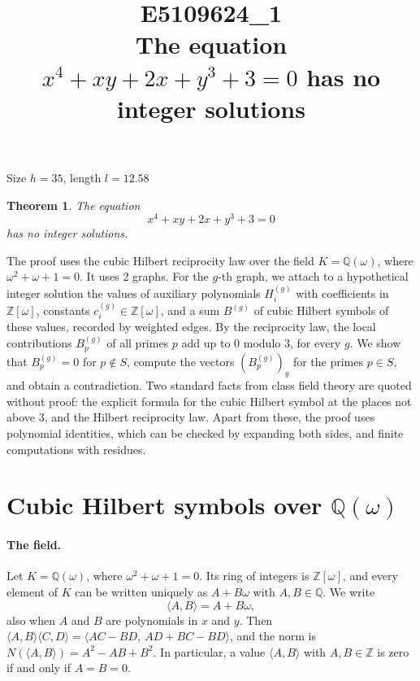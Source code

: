 \documentclass[11pt]{article}
\title{\textbf{E5109624\_1}\\[4pt] {\Large The equation $x^{4}+xy+2x+y^{3}+3=0$ has no integer solutions}}
\author{}
\date{}
\newtheorem{theorem}{Theorem}
\newcommand{\Z}{\mathbb{Z}}
\newcommand{\Q}{\mathbb{Q}}
\begin{document}
\maketitle
\vspace{-8ex}
\begin{center}
Size $h=35$, length $l=12.58$
\end{center}

\begin{theorem}\label{thm:main}
The equation
\begin{equation}\label{eq:main}
x^{4}+xy+2x+y^{3}+3=0
\end{equation}
has no integer solutions.
\end{theorem}

The proof uses the cubic Hilbert reciprocity law over the field $K=\Q(\omega)$, where $\omega^2+\omega+1=0$. It uses 2 graphs. For the $g$-th graph, we attach to a hypothetical integer solution the values of auxiliary polynomials $H^{(g)}_i$ with coefficients in $\Z[\omega]$, constants $c^{(g)}_i\in\Z[\omega]$, and a sum $B^{(g)}$ of cubic Hilbert symbols of these values, recorded by weighted edges. By the reciprocity law, the local contributions $B^{(g)}_p$ of all primes $p$ add up to $0$ modulo $3$, for every $g$. We show that $B^{(g)}_p=0$ for $p\notin S$, compute the vectors $(B^{(g)}_p)_g$ for the primes $p\in S$, and obtain a contradiction. Two standard facts from class field theory are quoted without proof: the explicit formula for the cubic Hilbert symbol at the places not above $3$, and the Hilbert reciprocity law. Apart from these, the proof uses polynomial identities, which can be checked by expanding both sides, and finite computations with residues.


\section{\texorpdfstring{Cubic Hilbert symbols over $\Q(\omega)$}{Cubic Hilbert symbols over Q(w)}}\label{sec:symbols}

\paragraph{The field.} Let $K=\Q(\omega)$, where $\omega^2+\omega+1=0$. Its ring of integers is $\Z[\omega]$, and every element of $K$ can be written uniquely as $A+B\omega$ with $A,B\in\Q$. We write
\[
\langle A,B\rangle=A+B\omega,
\]
also when $A$ and $B$ are polynomials in $x$ and $y$. Then $\langle A,B\rangle\langle C,D\rangle=\langle AC-BD,\ AD+BC-BD\rangle$, and the norm is $N(\langle A,B\rangle)=A^2-AB+B^2$. In particular, a value $\langle A,B\rangle$ with $A,B\in\Z$ is zero if and only if $A=B=0$.
\end{document}
